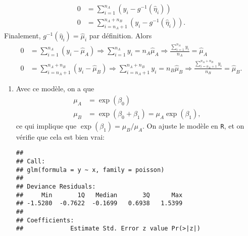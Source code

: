 \begin{solution}{6.3}
\begin{align*}
0&=\sum_{i=1}^{n_A} (y_i-g^{-1}(\hat{\eta}_i))\\
0&= \sum_{i=n_A+1}^{n_A+n_B}  (y_i-g^{-1}(\hat{\eta}_i)).
\end{align*}
Finalement, $g^{-1}(\hat{\eta}_i)=\hat{\mu}_i$ par définition. Alors
\begin{align*}
0&=\sum_{i=1}^{n_A} (y_i-\hat{\mu}_A) \Rightarrow \sum_{i=1}^{n_A}y_i =n_A\hat{\mu}_A \Rightarrow \frac{\sum_{i=1}^{n_A}y_i}{n_A} =\hat{\mu}_A\\
0&= \sum_{i=n_A+1}^{n_A+n_B}  (y_i-\hat{\mu}_B) \Rightarrow \sum_{i=n_A+1}^{n_A+n_B}y_i =n_B\hat{\mu}_B \Rightarrow \frac{\sum_{i=n_A+1}^{n_A+n_B}y_i}{n_B} =\hat{\mu}_B.
\end{align*}
\end{solution}
\begin{solution}{6.4}
\begin{enumerate}
\item Avec ce modèle, on a que
\begin{align*}
\mu_A &= \exp(\beta_0)\\
\mu_B &= \exp(\beta_0+\beta_1)=\mu_A \exp(\beta_1),
\end{align*} ce qui implique que $\exp(\beta_1)=\mu_B/\mu_A$. On ajuste le modèle en \texttt{R}, et on vérifie que cela est bien vrai:
\begin{knitrout}
\color{fgcolor}\begin{kframe}
\begin{alltt}
 \hlkwb{<-} \hlstd{(} \hlstd{,}\hlstd{,}\hlstd{,}\hlstd{,}\hlstd{,}\hlstd{,}\hlstd{,}\hlstd{,}\hlstd{,}\hlstd{,}\hlstd{,}\hlstd{,}\hlstd{,}\hlstd{,}\hlstd{,}\hlstd{,}\hlstd{,}\hlstd{,}\hlstd{,}\hlstd{)}
 \hlkwb{<-} \hlstd{(}\hlopt{:}\hlstd{,}\hlstd{=}\hlstd{)}
 \hlkwb{<-} \hlopt{~}
\end{alltt}
\begin{verbatim}
##
## Call:
## glm(formula = y ~ x, family = poisson)
##
## Deviance Residuals:
##     Min       1Q   Median       3Q      Max
## -1.5280  -0.7622  -0.1699   0.6938   1.5399
##
## Coefficients:
##             Estimate Std. Error z value Pr(>|z|)

\end{verbatim}
\end{kframe}
\end{knitrout}
\end{enumerate}
\end{solution}
